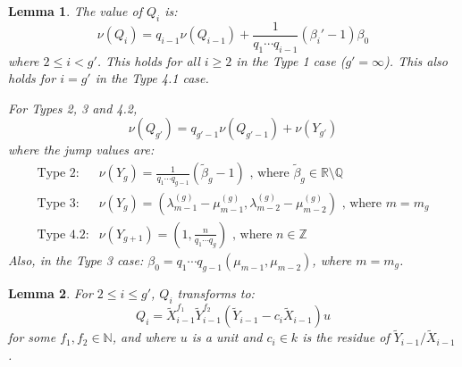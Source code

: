 \documentclass[10pt,a4paper]{amsart}
\newtheorem{lem}{Lemma}
\begin{document}
\begin{lem} \label{genvalue}
The value of $Q_i$ is:
\begin{equation} \label{usualgenvalue}
\nu(Q_i)=q_{i-1}\nu(Q_{i-1})+\frac{1}{q_1 \cdots q_{i-1}}(\beta_i'-1)\beta_0
\end{equation}
where $2\leq i < g'$. This holds for all $i\geq 2$ in the Type 1 case ($g'=\infty$). This also holds for $i=g'$ in the Type 4.1 case.

For Types 2, 3 and 4.2,
\begin{equation*}
\nu(Q_{g'})=q_{g'-1} \nu(Q_{g'-1})+\nu(Y_{g'})
\end{equation*}
where the jump values are:
\begin{equation*}
\begin{array}{ll}
\text{Type 2:} & \displaystyle \nu(Y_g)= \frac{1}{q_1\cdots q_{g-1}}\left(\tilde \beta_g -1\right) \text{ , where } \tilde \beta_{g}\in\mathbb{R}\setminus\mathbb{Q} \\
\text{Type 3:} & \displaystyle \nu(Y_g)= \left(\lambda_{m-1}^{(g)}-\mu_{m-1}^{(g)},\lambda_{m-2}^{(g)}-\mu_{m-2}^{(g)}\right) \text{ , where } m=m_g \\
\text{Type 4.2:} & \displaystyle \nu(Y_{g+1})=\left(1,\frac{n}{q_1 \cdots q_g}\right) \text{ , where } n\in\mathbb{Z}
\end{array}
\end{equation*}
Also, in the Type 3 case: $\beta_0=q_1\cdots q_{g-1}(\mu_{m-1},\mu_{m-2})$, where $m=m_g$.
\end{lem}

\begin{lem} \label{strict}
For $2\leq i\leq g'$, $Q_i$ transforms to:
\begin{equation*}
Q_i=\tilde X_{i-1}^{f_1}\tilde Y_{i-1}^{f_2}\left(\tilde Y_{i-1}-c_i\tilde X_{i-1}\right)u
\end{equation*}
for some $f_1,f_2\in\mathbb{N}$, and where $u$ is a unit and $c_i\in k$ is the residue of $\tilde Y_{i-1}/\tilde X_{i-1}$.
\end{lem}
\end{document}
